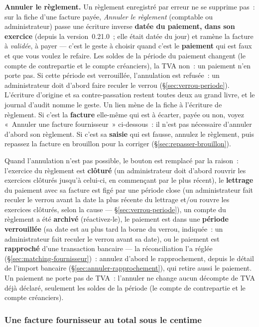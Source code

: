 \documentclass[a4paper,11pt,oneside]{article}
\begin{document}
\textbf{Annuler le règlement.} Un règlement enregistré par erreur ne se supprime pas~: sur la
fiche d'une facture payée, \emph{Annuler le règlement} (comptable ou administrateur) passe une
écriture inverse \textbf{datée du paiement, dans son exercice} (depuis la version~0.21.0~; elle
était datée du jour) et ramène la facture à \emph{validée}, à payer --- c'est
le geste à choisir quand c'est le \textbf{paiement} qui est faux et que vous voulez le refaire.
Les soldes de la période du paiement changent (le compte de contrepartie et le compte
créanciers), la TVA non~: un paiement n'en porte pas. Si cette période est verrouillée,
l'annulation est refusée~: un administrateur doit d'abord faire reculer le verrou
(\S\ref{sec:verrou-periode}).
L'écriture d'origine et sa contre-passation restent toutes deux au grand livre, et le journal
d'audit nomme le geste. Un lien mène de la fiche à l'écriture de règlement. Si c'est la
\textbf{facture} elle-même qui est à écarter, payée ou non, voyez «~Annuler une facture
fournisseur~» ci-dessous~: il n'est pas nécessaire d'annuler d'abord son règlement. Si c'est
sa \textbf{saisie} qui est fausse, annulez le règlement, puis repassez la facture en brouillon
pour la corriger (\S\ref{sec:repasser-brouillon}).

Quand l'annulation n'est pas possible, le bouton est remplacé par la raison~: l'exercice du
règlement est \textbf{clôturé} (un administrateur doit d'abord rouvrir les exercices clôturés
jusqu'à celui-ci, en commençant par le plus récent), le \textbf{lettrage} du paiement avec sa
facture est figé par une période close (un administrateur fait reculer le verrou avant la date
la plus récente du lettrage et/ou rouvre les exercices clôturés, selon la cause ---
\S\ref{sec:verrou-periode}), un compte du
règlement a été \textbf{archivé} (réactivez-le), le paiement est dans une \textbf{période
verrouillée} (sa date est au plus tard la borne du verrou, indiquée~: un administrateur fait
reculer le verrou avant sa date), ou le paiement est \textbf{rapproché} d'une transaction bancaire --- la
réconciliation l'a réglée (\S\ref{sec:matching-fournisseur})~: annulez d'abord le rapprochement,
depuis le détail de l'import bancaire (\S\ref{sec:annuler-rapprochement}), qui retire aussi le
paiement. Un paiement ne porte pas de TVA~: l'annuler ne change aucun décompte de TVA déjà
déclaré, seulement les soldes de la période (le compte de contrepartie et le compte
créanciers).

\subsubsection{Une facture fournisseur au total sous le centime}\label{sec:facture-fournisseur-sous-centime}
\end{document}
